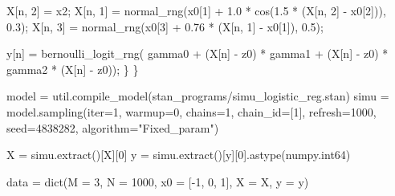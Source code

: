 \documentclass[
  letterpaper,
  DIV=11,
  numbers=noendperiod]{scrartcl}
\newenvironment{Shaded}{\begin{snugshade}}{\end{snugshade}}
\newcommand{\BuiltInTok}[1]{\textcolor[rgb]{0.00,0.23,0.31}{#1}}
\newcommand{\DecValTok}[1]{\textcolor[rgb]{0.68,0.00,0.00}{#1}}
\newcommand{\FloatTok}[1]{\textcolor[rgb]{0.68,0.00,0.00}{#1}}
\newcommand{\NormalTok}[1]{\textcolor[rgb]{0.00,0.23,0.31}{#1}}
\newcommand{\OperatorTok}[1]{\textcolor[rgb]{0.37,0.37,0.37}{#1}}
\newcommand{\StringTok}[1]{\textcolor[rgb]{0.13,0.47,0.30}{#1}}
\begin{document}
\begin{codelisting}
\begin{Shaded}
\begin{Highlighting}[]
\NormalTok{    X[n, }\DecValTok{2}\NormalTok{] = x2;}
\NormalTok{    X[n, }\DecValTok{1}\NormalTok{] = normal\_rng(x0[}\DecValTok{1}\NormalTok{] + }\FloatTok{1.0}\NormalTok{ * cos(}\FloatTok{1.5}\NormalTok{ * (X[n, }\DecValTok{2}\NormalTok{] {-} x0[}\DecValTok{2}\NormalTok{])), }\FloatTok{0.3}\NormalTok{);}
\NormalTok{    X[n, }\DecValTok{3}\NormalTok{] = normal\_rng(x0[}\DecValTok{3}\NormalTok{] + }\FloatTok{0.76}\NormalTok{ * (X[n, }\DecValTok{1}\NormalTok{] {-} x0[}\DecValTok{1}\NormalTok{]), }\FloatTok{0.5}\NormalTok{);}

\NormalTok{    y[n] = bernoulli\_logit\_rng(  gamma0 }
\NormalTok{                               + (X[n] {-} z0\textquotesingle{}) * gamma1}
\NormalTok{                               + (X[n] {-} z0\textquotesingle{}) * gamma2 * (X[n] {-} z0\textquotesingle{})\textquotesingle{});}
\NormalTok{  \}}
\NormalTok{\}}
\end{Highlighting}
\end{Shaded}

\end{codelisting}

\begin{Shaded}
\begin{Highlighting}[]
\NormalTok{model }\OperatorTok{=}\NormalTok{ util.compile\_model(}\StringTok{\textquotesingle{}stan\_programs/simu\_logistic\_reg.stan\textquotesingle{}}\NormalTok{)}
\NormalTok{simu }\OperatorTok{=}\NormalTok{ model.sampling(}\BuiltInTok{iter}\OperatorTok{=}\DecValTok{1}\NormalTok{, warmup}\OperatorTok{=}\DecValTok{0}\NormalTok{, chains}\OperatorTok{=}\DecValTok{1}\NormalTok{, chain\_id}\OperatorTok{=}\NormalTok{[}\DecValTok{1}\NormalTok{],}
\NormalTok{                      refresh}\OperatorTok{=}\DecValTok{1000}\NormalTok{, seed}\OperatorTok{=}\DecValTok{4838282}\NormalTok{,}
\NormalTok{                      algorithm}\OperatorTok{=}\StringTok{"Fixed\_param"}\NormalTok{)}

\NormalTok{X }\OperatorTok{=}\NormalTok{ simu.extract()[}\StringTok{\textquotesingle{}X\textquotesingle{}}\NormalTok{][}\DecValTok{0}\NormalTok{]}
\NormalTok{y }\OperatorTok{=}\NormalTok{ simu.extract()[}\StringTok{\textquotesingle{}y\textquotesingle{}}\NormalTok{][}\DecValTok{0}\NormalTok{].astype(numpy.int64)}

\NormalTok{data }\OperatorTok{=} \BuiltInTok{dict}\NormalTok{(M }\OperatorTok{=} \DecValTok{3}\NormalTok{, N }\OperatorTok{=} \DecValTok{1000}\NormalTok{, x0 }\OperatorTok{=}\NormalTok{ [}\OperatorTok{{-}}\DecValTok{1}\NormalTok{, }\DecValTok{0}\NormalTok{, }\DecValTok{1}\NormalTok{], X }\OperatorTok{=}\NormalTok{ X, y }\OperatorTok{=}\NormalTok{ y)}
\end{Highlighting}
\end{Shaded}
\end{document}
